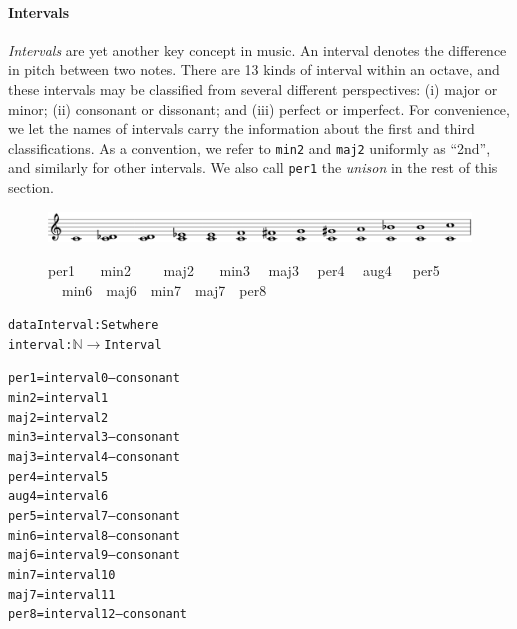 \paragraph{Intervals}

\emph{Intervals} are yet another key concept in music.
An interval denotes the difference in pitch between two notes.
There are 13 kinds of interval within an octave, and these intervals
may be classified from several different perspectives: (i) major or minor;
(ii) consonant or dissonant; and (iii) perfect or imperfect.
For convenience, we let the names of intervals carry the information
about the first and third classifications.
As a convention, we refer to \texttt{min2} and \texttt{maj2}  uniformly
as ``2nd'', and similarly for other intervals.
We also call \texttt{per1} the \emph{unison} in the rest of this section.

\begin{figure}[h]
  \includegraphics[width=12cm]{interval.png} \\
  \begin{flushleft}
    \begin{small}
      \hspace{1.45cm} per1 \ \ \ min2 \ \ \ \ maj2 \ \ \ min3 \ \ maj3
      \ \ per4 \ \ aug4 \ \ \,per5 \ \ min6 \ \,maj6 \ \,min7 \ \,maj7 \ \,per8
    \end{small}
  \end{flushleft}
\end{figure}
  
\begin{alltt}
data Interval : Set where
interval : \(\mathbb{N}\) \(\rightarrow\) Interval

per1  = interval 0 -- consonant
min2  = interval 1
maj2  = interval 2
min3  = interval 3 -- consonant
maj3  = interval 4 -- consonant
per4  = interval 5 
aug4  = interval 6
per5  = interval 7 -- consonant
min6  = interval 8 -- consonant
maj6  = interval 9 -- consonant
min7  = interval 10
maj7  = interval 11
per8  = interval 12 -- consonant
\end{alltt}
